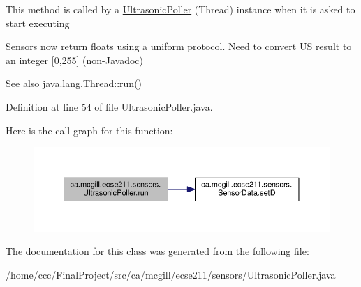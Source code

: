 This method is called by a \hyperlink{classca_1_1mcgill_1_1ecse211_1_1sensors_1_1_ultrasonic_poller}{Ultrasonic\+Poller} (Thread) instance when it is asked to start executing

Sensors now return floats using a uniform protocol. Need to convert US result to an integer \mbox{[}0,255\mbox{]} (non-\/\+Javadoc)

\begin{DoxySeeAlso}{See also}
java.\+lang.\+Thread\+::run() 
\end{DoxySeeAlso}


Definition at line 54 of file Ultrasonic\+Poller.\+java.

Here is the call graph for this function\+:
\nopagebreak
\begin{figure}[H]
\begin{center}
\leavevmode
\includegraphics[width=350pt]{classca_1_1mcgill_1_1ecse211_1_1sensors_1_1_ultrasonic_poller_acc71fac612a72c197244c71d6cf7b6e1_cgraph}
\end{center}
\end{figure}


The documentation for this class was generated from the following file\+:\begin{DoxyCompactItemize}
\item 
/home/ccc/\+Final\+Project/src/ca/mcgill/ecse211/sensors/Ultrasonic\+Poller.\+java\end{DoxyCompactItemize}

